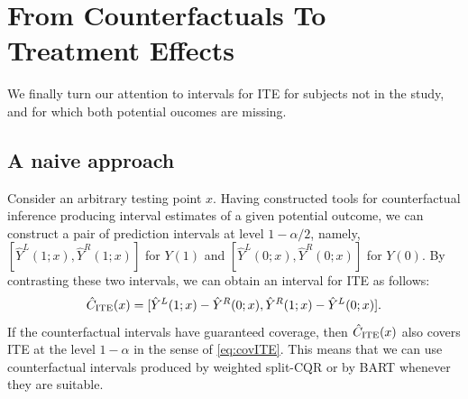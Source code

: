 

\section{From Counterfactuals To Treatment Effects}\label{sec:effect}

We finally turn our attention to intervals for ITE for subjects not in
the study, and for which both potential oucomes are missing.

\subsection{A naive approach}\label{subsec:naive}

Consider an arbitrary testing point $x$.  Having constructed tools for
counterfactual inference producing interval estimates of a given
potential outcome, we can construct a pair of prediction intervals at
level $1-\alpha/2$, namely, $[\hat{Y}^{L}(1; x), \hat{Y}^{R}(1; x)]$
for $Y(1)$ and $[\hat{Y}^{L}(0; x), \hat{Y}^{R}(0; x)]$ for $Y(0)$. By
contrasting these two intervals, we can obtain an interval for ITE as
follows: 
\[\hat{C}_\text{ITE}(x) = [\hat{Y}^{L}(1; x) - \hat{Y}^{R}(0; x), \hat{Y}^{R}(1; x) - \hat{Y}^{L}(0; x)].\]
If the counterfactual intervals have guaranteed coverage, then
$\hat{C}_\text{ITE}(x)$ also covers ITE at the level $1-\alpha$ in the sense of
\eqref{eq:covITE}. 
This means that we can use
counterfactual intervals produced by weighted split-CQR or by BART
whenever they are suitable.

